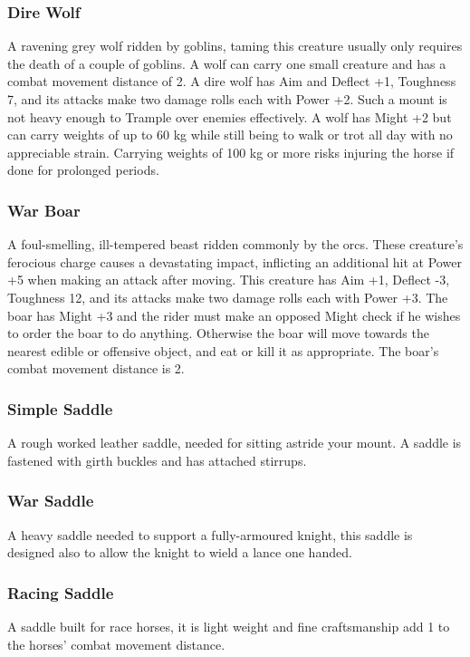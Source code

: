 \subsubsection*{Dire Wolf}
A ravening grey wolf ridden by goblins, taming this creature usually only requires the death of a couple of goblins. A wolf can carry one small creature and has a combat movement distance of 2. A dire wolf has Aim and Deflect +1, Toughness 7, and its attacks make two damage rolls each with Power +2. Such a mount is not heavy enough to Trample over enemies effectively. A wolf has Might +2 but can carry weights of up to 60 kg while still being to walk or trot all day with no appreciable strain. Carrying weights of 100 kg or more risks injuring the horse if done for prolonged periods.

\subsubsection*{War Boar}
A foul-smelling, ill-tempered beast ridden commonly by the orcs. These creature's ferocious charge causes a devastating impact, inflicting an additional hit at Power +5 when making an attack after moving. This creature has Aim +1, Deflect -3, Toughness 12, and its attacks make two damage rolls each with Power +3. The boar has Might +3 and the rider must make an opposed Might check if he wishes to order the boar to do anything. Otherwise the boar will move towards the nearest edible or offensive object, and eat or kill it as appropriate. The boar's combat movement distance is 2.

\subsubsection*{Simple Saddle}
A rough worked leather saddle, needed for sitting astride your mount. A saddle is fastened with girth buckles and has attached stirrups.

\subsubsection*{War Saddle}
A heavy saddle needed to support a fully-armoured knight, this saddle is designed also to allow the knight to wield a lance one handed.

\subsubsection*{Racing Saddle}
A saddle built for race horses, it is light weight and fine craftsmanship add 1 to the horses' combat movement distance.

